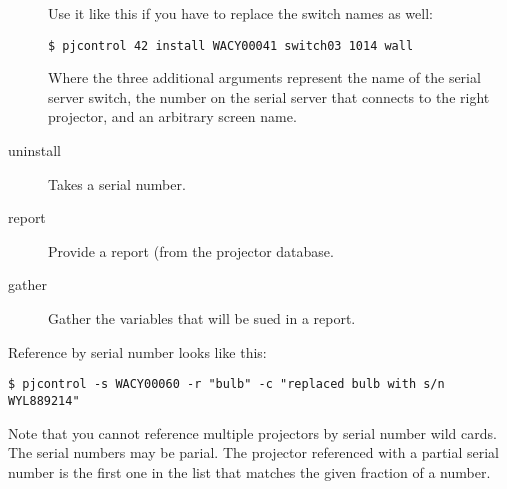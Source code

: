 \documentclass[11pt]{article}
\begin{document}
\begin{description}
  Use it like this if you have to replace the switch names as well:

\begin{verbatim}
$ pjcontrol 42 install WACY00041 switch03 1014 wall
\end{verbatim}

 Where the three additional arguments represent the name of the serial
 server switch, the number on the serial server that connects to the
 right projector, and an arbitrary screen name.


\item[uninstall] Takes a serial number.

\item[report] Provide a report (from the projector database.

\item[gather] Gather the variables that will be sued in a report.


\end{description}

Reference by serial number looks like this:

\begin{verbatim}
$ pjcontrol -s WACY00060 -r "bulb" -c "replaced bulb with s/n WYL889214"
\end{verbatim}

Note that you cannot reference multiple projectors by serial number
wild cards.  The serial numbers may be parial.  The projector
referenced with a partial serial number is the first one in the list
that matches the given fraction of a number.
\end{document}
